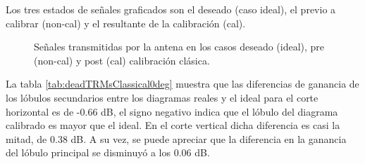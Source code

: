 Los tres estados de señales graficados son el deseado (caso ideal), el previo a calibrar (non-cal) y el resultante de la
calibración (cal).
\begin{figure}[H]
	\centering

	\caption{Señales transmitidas por la antena en los casos deseado (ideal), pre (non-cal) y post (cal) calibración clásica.}
	\label{fig:deadTRMsClassical0deg}
\end{figure}

La tabla \ref{tab:deadTRMsClassical0deg} muestra que las diferencias de ganancia de los lóbulos secundarios entre los diagramas 
reales y el ideal para el corte horizontal es de -0.66 dB, el signo negativo indica que el lóbulo del diagrama calibrado es mayor
que el ideal. En el corte vertical dicha diferencia es casi la mitad, de 0.38 dB. A su vez, se puede apreciar que la diferencia
en la ganancia del lóbulo principal se disminuyó a los 0.06 dB.

